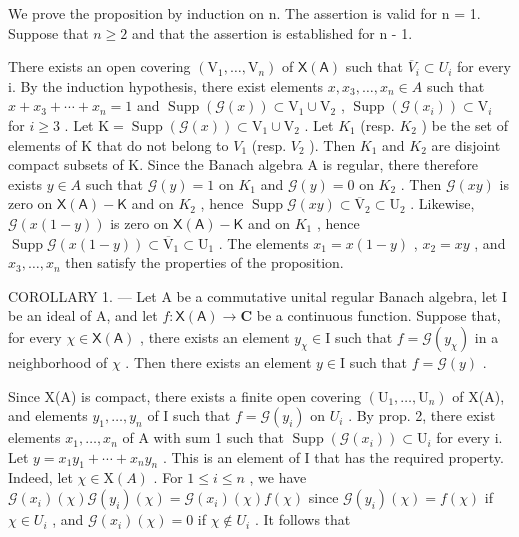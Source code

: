 We prove the proposition by induction on n. The assertion is valid for n = 1. Suppose that \(n \geqslant 2\) and that the assertion is established for n - 1.

There exists an open covering \((\mathrm{V}_{1},\ldots,\mathrm{V}_{n})\) of \(\mathsf{X}(\mathsf{A})\) such that \(\overline{V}_{i}\subset U_{i}\) for every i. By the induction hypothesis, there exist elements \(x,x_{3},\ldots,x_{n}\in A\) such that \(x+x_{3}+\cdots+x_{n}=1\) and \(\operatorname{Supp}(\mathcal{G}(x))\subset\mathrm{V}_{1}\cup\mathrm{V}_{2}\) , \(\operatorname{Supp}(\mathcal{G}(x_{i}))\subset\mathrm{V}_{i}\) for \(i\geqslant3\) . Let \(\mathrm{K}=\operatorname{Supp}(\mathcal{G}(x))\subset\mathrm{V}_{1}\cup\mathrm{V}_{2}\) . Let \(K_{1}\) (resp. \(K_{2}\) ) be the set of elements of K that do not belong to \(V_{1}\) (resp. \(V_{2}\) ). Then \(K_{1}\) and \(K_{2}\) are disjoint compact subsets of K. Since the Banach algebra A is regular, there therefore exists \(y\in A\) such that \(\mathcal{G}(y)=1\) on \(K_{1}\) and \(\mathcal{G}(y)=0\) on \(K_{2}\) . Then \(\mathcal{G}(xy)\) is zero on \(\mathsf{X}(\mathsf{A})-\mathsf{K}\) and on \(K_{2}\) , hence \(\operatorname{Supp}\mathcal{G}(xy)\subset\overline{\mathrm{V}}_{2}\subset\mathrm{U}_{2}\) . Likewise, \(\mathcal{G}(x(1-y))\) is zero on \(\mathsf{X}(\mathsf{A})-\mathsf{K}\) and on \(K_{1}\) , hence \(\operatorname{Supp}\mathcal{G}(x(1-y))\subset\overline{\mathrm{V}}_{1}\subset\mathrm{U}_{1}\) . The elements \(x_{1}=x(1-y)\) , \(x_{2}=xy\) , and \(x_{3},\ldots,x_{n}\) then satisfy the properties of the proposition.

COROLLARY 1. --- Let A be a commutative unital regular Banach algebra, let I be an ideal of A, and let \(f: \mathsf{X}(\mathsf{A}) \to \mathbf{C}\) be a continuous function. Suppose that, for every \(\chi \in \mathsf{X}(\mathsf{A})\) , there exists an element \(y_{\chi} \in \mathrm{I}\) such that \(f = \mathcal{G}(y_{\chi})\) in a neighborhood of \(\chi\) . Then there exists an element \(y \in \mathrm{I}\) such that \(f = \mathcal{G}(y)\) .

Since X(A) is compact, there exists a finite open covering \((\mathrm{U}_{1},\ldots,\mathrm{U}_{n})\) of X(A), and elements \(y_{1},\ldots,y_{n}\) of I such that \(f=\mathcal{G}(y_{i})\) on \(U_{i}\) . By prop. 2, there exist elements \(x_{1},\ldots,x_{n}\) of A with sum 1 such that \(\operatorname{Supp}(\mathcal{G}(x_{i}))\subset\mathrm{U}_{i}\) for every i. Let \(y=x_{1}y_{1}+\cdots+x_{n}y_{n}\) . This is an element of I that has the required property. Indeed, let \(\chi\in\mathrm{X}(A)\) . For \(1\leqslant i\leqslant n\) , we have \(\mathcal{G}(x_{i})(\chi)\mathcal{G}(y_{i})(\chi)=\mathcal{G}(x_{i})(\chi)f(\chi)\) since \(\mathcal{G}(y_{i})(\chi)=f(\chi)\) if \(\chi\in U_{i}\) , and \(\mathcal{G}(x_{i})(\chi)=0\) if \(\chi\notin U_{i}\) . It follows that

